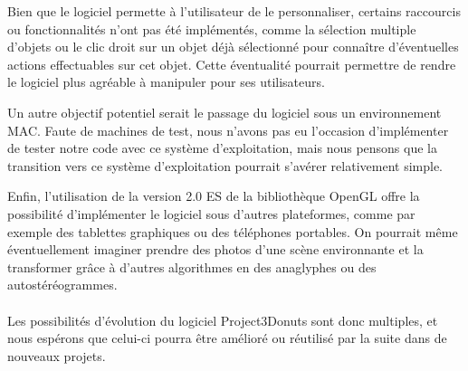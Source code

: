 Bien que le logiciel permette à l'utilisateur de le personnaliser, certains raccourcis ou fonctionnalités n'ont pas été implémentés, comme la sélection multiple d'objets ou le clic droit sur un objet déjà sélectionné pour connaître d'éventuelles actions effectuables sur cet objet. Cette éventualité pourrait permettre de rendre le logiciel plus agréable à manipuler pour ses utilisateurs.

Un autre objectif potentiel serait le passage du logiciel sous un environnement MAC. Faute de machines de test, nous n'avons pas eu l'occasion d'implémenter de tester notre code avec ce système d'exploitation, mais nous pensons que la transition vers ce système d'exploitation pourrait s'avérer relativement simple.

Enfin, l'utilisation de la version 2.0 ES de la bibliothèque OpenGL offre la possibilité d'implémenter le logiciel sous d'autres plateformes, comme par exemple des tablettes graphiques ou des téléphones portables. On pourrait même éventuellement imaginer prendre des photos d'une scène environnante et la transformer grâce à d'autres algorithmes en des anaglyphes ou des autostéréogrammes. 

\paragraph{}
Les possibilités d'évolution du logiciel Project3Donuts sont donc multiples, et nous espérons que celui-ci pourra être amélioré ou réutilisé par la suite dans de nouveaux projets.
